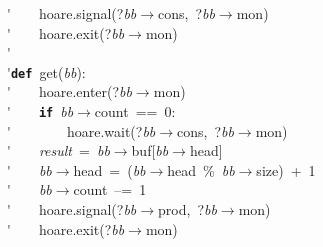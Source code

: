 \'\>~~~~hoare.signal(?\textit{bb}$\rightarrow$cons,~?\textit{bb}$\rightarrow$mon)\\

\'\>~~~~hoare.exit(?\textit{bb}$\rightarrow$mon)\\

\'\>\\

\'\>\texttt{\textbf{def}}~get(\textit{bb}):\\

\'\>~~~~hoare.enter(?\textit{bb}$\rightarrow$mon)\\

\'\>~~~~\texttt{\textbf{if}}~\textit{bb}$\rightarrow$count~==~0:\\

\'\>~~~~~~~~hoare.wait(?\textit{bb}$\rightarrow$cons,~?\textit{bb}$\rightarrow$mon)\\

\'\>~~~~\textit{result}~=~\textit{bb}$\rightarrow$buf[\textit{bb}$\rightarrow$head]\\

\'\>~~~~\textit{bb}$\rightarrow$head~=~(\textit{bb}$\rightarrow$head~\%~\textit{bb}$\rightarrow$size)~+~1\\

\'\>~~~~\textit{bb}$\rightarrow$count~--=~1\\

\'\>~~~~hoare.signal(?\textit{bb}$\rightarrow$prod,~?\textit{bb}$\rightarrow$mon)\\

\'\>~~~~hoare.exit(?\textit{bb}$\rightarrow$mon)